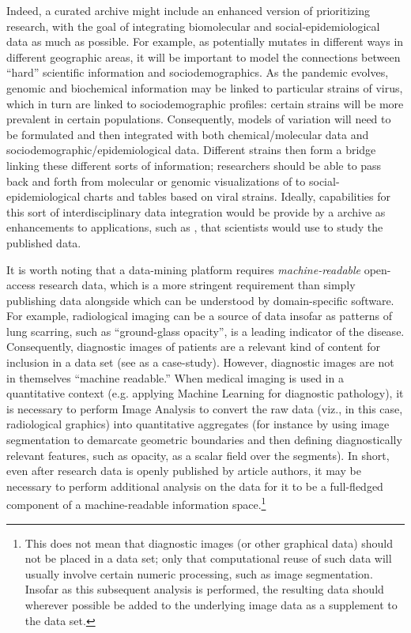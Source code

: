 \documentclass[11pt,letterpaper]{article}
\newcommand{\Covid}{\resizebox{!}{7pt}{\AcronymText{Covid-19}}}
\newcommand{\IQmol}{\resizebox{!}{7pt}{\AcronymText{IQmol}}}
\newcommand{\textscc}[1]{{\color{orr!35!black}{{%
						\fontfamily{Cabin-TLF}\fontseries{b}\selectfont{\textsc{\scriptsize{#1}}}}}}}
\newcommand{\AcronymText}[1]{{\textscc{#1}}}
\newcommand{\p}[1]{

\vspace{.75em}#1}
\newcommand{\q}[1]{{\fontfamily{qcr}\selectfont ``}#1{\fontfamily{qcr}\selectfont ''}}
\begin{document}
\p{Indeed, a curated \Covid{} archive 
might include an enhanced version of \IQmol{} prioritizing 
\Covid{} research, with the goal of integrating biomolecular 
and social-epidemiological data as much as possible.  
For example, as \Covid{} potentially mutates in different 
ways in different geographic areas, it will be important 
to model the connections between \q{hard} scientific 
\Covid{} information and sociodemographics.  
As the pandemic evolves, genomic and biochemical information 
may be linked to particular strains of virus, which 
in turn are linked to sociodemographic profiles: certain 
strains will be more prevalent in certain populations.  
Consequently, models of \Covid{} variation will need to be 
formulated and then integrated with both chemical/molecular 
data and sociodemographic/epidemiological data.  Different 
\Covid{} strains then form a bridge linking these different 
sorts of information; researchers should be able to pass 
back and forth from molecular or genomic visualizations of 
\Covid{} to social-epidemiological charts and tables based 
on viral strains.  Ideally, capabilities for this 
sort of interdisciplinary data integration would be 
provide by a \Covid{} archive as enhancements to applications, 
such as \IQmol{}, that scientists would use to study the 
published data.}

\p{It is worth noting that a data-mining platform requires 
\textit{machine-readable} open-access research data, 
which is a more stringent requirement than simply publishing 
data alongside which can be understood by domain-specific 
software.  For example, radiological imaging can be a source 
of \Covid{} data insofar as patterns of lung 
scarring, such as \q{ground-glass opacity}, is a leading 
indicator of the disease.  Consequently, diagnostic 
images of \Covid{} patients are a relevant kind of 
content for inclusion in a \Covid{} data set 
(see \cite{Shi} as a case-study).  However, 
diagnostic images are not in themselves 
\q{machine readable.}  When medical imaging is 
used in a quantitative context (e.g. applying 
Machine Learning for diagnostic pathology), it is necessary to perform Image Analysis to convert the raw data 
(viz., in this case, radiological graphics) into 
quantitative aggregates (for instance by using image 
segmentation to demarcate geometric boundaries and 
then defining diagnostically relevant features, such 
as opacity, as a scalar field over the segments).  
In short, even after research data is openly published 
by article authors, it may be necessary to perform 
additional analysis on the data for it to be 
a full-fledged component of a 
machine-readable information space.\footnote{%
This does not mean that diagnostic images (or 
other graphical data) should not be placed in a 
data set; only that computational reuse of such 
data will usually involve certain numeric 
processing, such as image segmentation.  
Insofar as this subsequent analysis is performed, 
the resulting data should wherever possible 
be added to the underlying image data as a 
supplement to the data set.}} 
\end{document}
